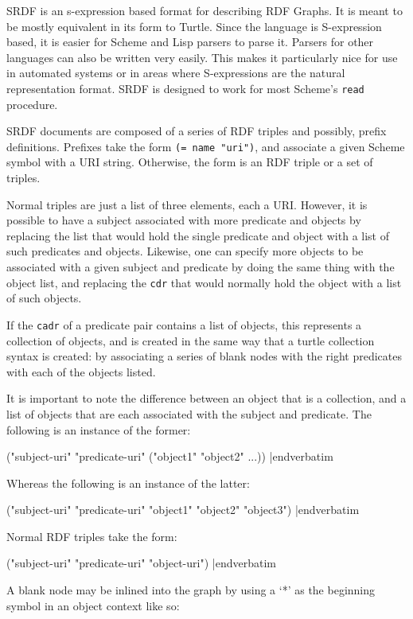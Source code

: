 SRDF is an s-expression based format for describing RDF Graphs.  It is
meant to be mostly equivalent in its form to Turtle. Since the language
is S-expression based, it is easier for Scheme and Lisp parsers to
parse it. Parsers for other languages can also be written very
easily. This makes it particularly nice for use in automated systems
or in areas where S-expressions are the natural representation format.
SRDF is designed to work for most Scheme's {\tt read} procedure. 

SRDF documents are composed of a series of RDF triples and possibly,
prefix definitions. Prefixes take the form
{\tt (= name "uri")}, and associate a given Scheme
symbol with a URI string. Otherwise, the form is an RDF triple or a set
of triples.

Normal triples are just a list of three elements, each a URI. However,
it is possible to have a subject associated with more predicate
and objects by replacing the list that would hold the single
predicate and object with a list of such predicates and objects.
Likewise, one can specify more objects to be associated with a
given subject and predicate by doing the same thing with the
object list, and replacing the {\tt cdr} that would normally hold the
object with a list of such objects.

If the {\tt cadr} of a predicate pair contains a list of objects, this
represents a collection of objects, and is created in the same
way that a turtle collection syntax is created: by associating
a series of blank nodes with the right predicates with each of
the objects listed.

It is important to note the difference between an object that
is a collection, and a list of objects that are each associated
with the subject and predicate. The following is an instance of
the former:

\medskip\verbatim
("subject-uri" "predicate-uri"
  ("object1" "object2" ...))
|endverbatim
\medskip

\noindent Whereas the following is an instance of the latter:

\medskip\verbatim
("subject-uri" "predicate-uri"
  "object1"
  "object2"
  "object3")
|endverbatim
\medskip

Normal RDF triples take the form:

\medskip\verbatim
("subject-uri" "predicate-uri" "object-uri")
|endverbatim
\medskip

A blank node may be inlined into the graph by using a `*' as the
beginning symbol in an object context like so:

